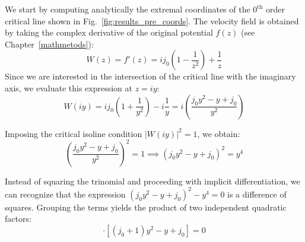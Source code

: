 \documentclass[english,binding=0.6cm,noexaminfo]{sapthesis}
\begin{document}
We start by computing analytically the  extremal coordinates of the $0^{\text{th}}$ order critical line shown in Fig.~\ref{fig:results_pre_coords}. The velocity field is obtained by taking the complex derivative of the original potential $f(z)$ (see Chapter~\ref{mathmetods}):
\begin{equation}
    W(z) = f'(z) = ij_0 \left( 1 - \frac{1}{z^2} \right) + \frac{1}{z}
\end{equation}
Since we are interested in the intersection of the critical line with the imaginary axis, we evaluate this expression at $z=iy$:
\begin{equation}
    W(iy) = ij_0 \left( 1 + \frac{1}{y^2} \right) - i \frac{1}{y} = i \left( \frac{j_0 y^2 - y + j_0}{y^2} \right)
\end{equation}

Imposing the critical isoline condition $|W(iy)|^2=1$, we obtain:
\begin{equation}
    \left( \frac{j_0 y^2 - y + j_0}{y^2} \right)^2 = 1 \implies (j_0 y^2 - y + j_0)^2 = y^4
\end{equation}

Instead of squaring the trinomial and proceeding with implicit differentiation, we can recognize that the expression $(j_0 y^2 - y + j_0)^2 - y^4 = 0$ is a difference of squares. Grouping the terms yields the product of two independent quadratic factors:
\begin{equation}
    [(j_0 - 1)y^2 - y + j_0] \cdot [(j_0+1)y^2 - y + j_0] = 0
    \label{solutions}
\end{equation}
\end{document}
